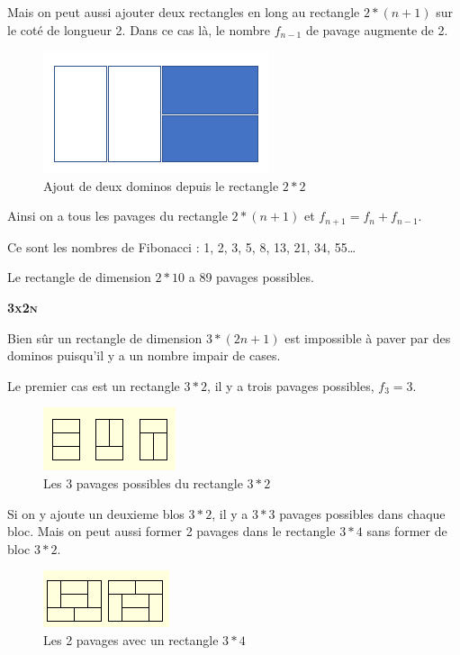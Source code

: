 \documentclass{article}
\begin{document}
Mais on peut aussi ajouter deux rectangles en long au rectangle $2*(n+1)$ sur le coté de longueur 2. Dans ce cas là, le nombre $f_{n-1}$ de pavage augmente de 2.

\begin{figure} [!h]
    \center
    \includegraphics [scale=0.5] {image/domino_n+2.png}
    \caption{Ajout de deux dominos depuis le rectangle $2*2$}
\end{figure}

Ainsi on a tous les pavages du rectangle $2*(n+1)$ et $f_{n+1} = f_{n} + f_{n-1}$.

Ce sont les nombres de Fibonacci : 1, 2, 3, 5, 8, 13, 21, 34, 55…

Le rectangle de dimension $2*10$ a 89 pavages possibles.

\hspace{1.5cm}

\textbf{\textsc{3x2n}}

Bien sûr un rectangle de dimension $3*(2n+1)$ est impossible à paver par des dominos puisqu'il y a un nombre impair de cases.

Le premier cas est un rectangle $3*2$, il y a trois pavages possibles, $f_{3} = 3$.

\begin{figure} [!h]
    \center
    \includegraphics [scale=0.7] {image/pavage_3x2.png}
    \caption{Les 3 pavages possibles du rectangle $3*2$}
\end{figure}

Si on y ajoute un deuxieme blos $3*2$, il y a $3*3$ pavages possibles dans chaque bloc.
Mais on peut aussi former 2 pavages dans le rectangle $3*4$ sans former de bloc $3*2$.

\begin{figure} [!h]
    \center
    \includegraphics [scale=0.7] {image/pavage_3x6.png}
    \caption{Les 2 pavages avec un rectangle $3*4$}
\end{figure}
\end{document}
